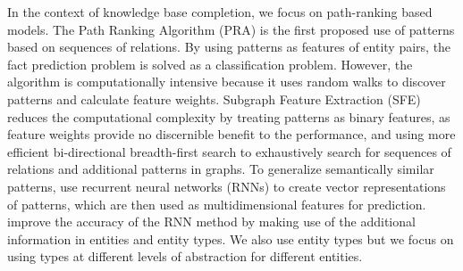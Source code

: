 \documentclass[letterpaper]{article} %
\begin{document}
In the context of knowledge base completion, we focus on path-ranking based models. The Path Ranking Algorithm (PRA) \cite{pra} is the first proposed use of patterns based on sequences of relations.  By using patterns as features of entity pairs, the fact prediction problem is solved as a classification problem.  However, the algorithm is computationally intensive because it uses random walks to discover patterns and calculate feature weights.  Subgraph Feature Extraction (SFE) \cite{sfe} reduces the computational complexity by treating patterns as binary features, as feature weights provide no discernible benefit to the performance, and using more efficient bi-directional breadth-first search to exhaustively search for sequences of relations and additional patterns in graphs.  To generalize semantically similar patterns, \cite{cvsm} use recurrent neural networks (RNNs) to create vector representations of patterns, which are then used as multidimensional features for prediction. \cite{chains} improve the accuracy of the RNN method by making use of the additional information in entities and entity types. We also use entity types but we focus on using types at different levels of abstraction for different entities.

\end{document}
